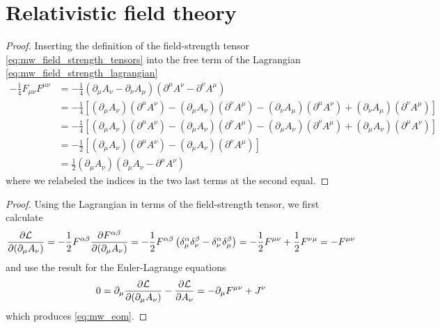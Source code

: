\section{Relativistic field theory}

\mwfieldstrengthlagrangian
\begin{proof}
	Inserting the definition of the field-strength tensor \cref{eq:mw_field_strength_tensors} into the free term of the Lagrangian \cref{eq:mw_field_strength_lagrangian}
	\begin{equation*}
		\begin{split}
			-
			\frac{1}{4}
			F_{\mu\nu}
			F^{\mu\nu}
			&=
			-
			\frac{1}{4}
			\left(
				\partial_\mu A_\nu
				-
				\partial_\nu A_\mu
			\right)
			\left(
				\partial^\mu A^\nu
				-
				\partial^\nu A^\mu
			\right)
			\\
			&=
			-
			\frac{1}{4}
			\left[
				(\partial_\mu A_\nu)
				(\partial^\mu A^\nu)
				-
				(\partial_\mu A_\nu)
				(\partial^\nu A^\mu)
				-
				(\partial_\nu A_\mu)
				(\partial^\mu A^\nu)
				+
				(\partial_\nu A_\mu)
				(\partial^\nu A^\mu)
			\right]
			\\
			&=
			-
			\frac{1}{4}
			\left[
				(\partial_\mu A_\nu)
				(\partial^\mu A^\nu)
				-
				(\partial_\mu A_\nu)
				(\partial^\nu A^\mu)
				-
				(\partial_\mu A_\nu)
				(\partial^\nu A^\mu)
				+
				(\partial_\mu A_\nu)
				(\partial^\mu A^\nu)
			\right]
			\\
			&=
			-
			\frac{1}{2}
			\left[
				(\partial_\mu A_\nu)
				(\partial^\mu A^\nu)
				-
				(\partial_\mu A_\nu)
				(\partial^\nu A^\mu)
			\right]
			\\
			&=
			\frac{1}{2}
			(\partial_\mu A_\nu)
			\left(
				\partial_\mu A_\nu
				-
				\partial^\mu A^\nu
			\right)
		\end{split}
	\end{equation*}
	where we relabeled the indices in the two last terms at the second equal.
\end{proof}
\mweom
\begin{proof}
	Using the Lagrangian in terms of the field-strength tensor, we first calculate
	\begin{equation*}
		\pdv{\mathcal{L}}{(\partial_\mu A_\nu)}
		=
		-
		\frac{1}{2}
		F^{\alpha\beta}
		\pdv{F^{\alpha\beta}}{(\partial_\mu A_\nu)}
		=
		-
		\frac{1}{2}
		F^{\alpha\beta}
		\left(
			\delta^\alpha_\mu
			\delta^\beta_\nu
			-
			\delta^\alpha_\nu
			\delta^\beta_\mu
		\right)
		=
		-
		\frac{1}{2}
		F^{\mu\nu}
		+
		\frac{1}{2}
		F^{\nu\mu}
		=
		-
		F^{\mu\nu}
	\end{equation*}
	and use the result for the Euler-Lagrange equations
	\begin{equation*}
		0
		=
		\partial_\mu
		\pdv{\mathcal{L}}{(\partial_\mu A_\nu)}
		-
		\pdv{\mathcal{L}}{A_\nu}
		=
		-
		\partial_\mu
		F^{\mu\nu}
		+
		J^\nu
	\end{equation*}
	which produces \cref{eq:mw_eom}.
\end{proof}

